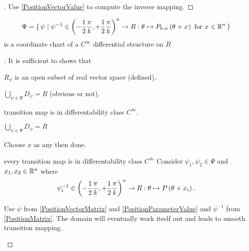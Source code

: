 \documentclass[stu, babel, american, biblatex, a4paper, leqno, draftall]{apa7}
\begin{document}
\begin{proof}[]
    \skipped

    Use \cref{PositionVectorValue} to compute the inverse mapping.
\end{proof}
\begin{lemma}\label{CoordinateChart}
    \begin{equation*}
        \Psi=\set{\psi|
            \psi^{-1}
            \in \left(-\frac{1}{2}\frac{\pi}{k},+\frac{1}{2}\frac{\pi}{k}\right)^n \to R
            :\tensor{\theta}{}\mapsto P_{k,n}\left(\tensor{\theta}{}+\tensor{x}{}\right)
            \text{ for }
            \tensor{x}{} \in \R^n
        }
    \end{equation*} is a coordinate chart of a $C^\infty$ differential structure on $R$
\end{lemma}
\begin{proof}[]
    It is sufficient to shows that
    \begin{APAenumerate}
        \item $R_\psi$ is an open subset of real vector space (defined),
        \item $\bigcup_{\psi\in\Psi} D_\psi = R$ (obvious or not),
        \item transition map is in differentability class $C^\infty$.
    \end{APAenumerate}
    \begin{subproof}{$\bigcup_{\psi\in\Psi} D_\psi = R$}
        \skipped

        Choose $x$ as any then done.
    \end{subproof}
    \begin{subproof}{every transition map is in differentability class $C^\infty$}
        Consider $\psi_1, \psi_2 \in \Psi$ and $x_1, x_2 \in \mathbb{R}^n$ where
        \begin{equation*}
            \psi_i^{-1}
            \in \left(-\frac{1}{2}\frac{\pi}{k},+\frac{1}{2}\frac{\pi}{k}\right)^n \to R
            :\tensor{\theta}{}\mapsto P\left(\tensor{\theta}{}+x_i\right)
            \text{.}
        \end{equation*}

        \skipped

        Use $\psi$ from \cref{PositionVectorMatrix} and \cref{PositionParameterValue}
        and $\psi^{-1}$ from \cref{PositionMatrix}.
        The domain will eventually work itself out and leads to smooth transition mapping.
    \end{subproof}
\end{proof}
\end{document}
